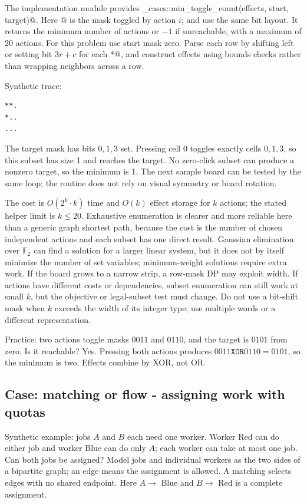 The implementation module provides
\verb@finals_cases::min_toggle_count(effects, start, target)@. Here
\verb@effects[i]@ is the mask toggled by action $i$; \verb@start@ and
\verb@target@ use the same bit layout. It returns the minimum number of
actions or $-1$ if unreachable, with a maximum of 20 actions. For this
problem use start mask zero. Parse each row by shifting left or setting bit
$3r+c$ for each \verb@*@, and construct effects using bounds checks rather
than wrapping neighbors across a row.

Synthetic trace:
\begin{lstlisting}
**.
*..
...
\end{lstlisting}
The target mask has bits $0,1,3$ set. Pressing cell 0 toggles exactly cells
$0,1,3$, so this subset has size 1 and reaches the target. No zero-click
subset can produce a nonzero target, so the minimum is 1. The next sample
board can be tested by the same loop; the routine does not rely on visual
symmetry or board rotation.

The cost is $O(2^k\cdot k)$ time and $O(k)$ effect storage for $k$ actions;
the stated helper limit is $k\le20$. Exhaustive enumeration is clearer and
more reliable here than a generic graph shortest path, because the cost is
the number of chosen independent actions and each subset has one direct
result. Gaussian elimination over $\mathbb F_2$ can find a solution for a
larger linear system, but it does not by itself minimize the number of set
variables; minimum-weight solutions require extra work. If the board grows
to a narrow strip, a row-mask DP may exploit width. If actions have different
costs or dependencies, subset enumeration can still work at small $k$, but
the objective or legal-subset test must change. Do not use a bit-shift mask
when $k$ exceeds the width of its integer type; use multiple words or a
different representation.

Practice: two actions toggle masks $0011$ and $0110$, and the target is
$0101$ from zero. Is it reachable? Yes. Pressing both actions produces
$0011\mathbin{\mathtt{XOR}}0110=0101$, so the minimum is two. Effects combine
by XOR, not OR.

\subsection{Case: matching or flow - assigning work with quotas}
\label{case:matching}

Synthetic example: jobs $A$ and $B$ each need one worker. Worker Red can do
either job and worker Blue can do only $A$; each worker can take at most one
job. Can both jobs be assigned? Model jobs and individual workers as the two
sides of a bipartite graph; an edge means the assignment is allowed. A
matching selects edges with no shared endpoint. Here $A\to$ Blue and
$B\to$ Red is a complete assignment.

